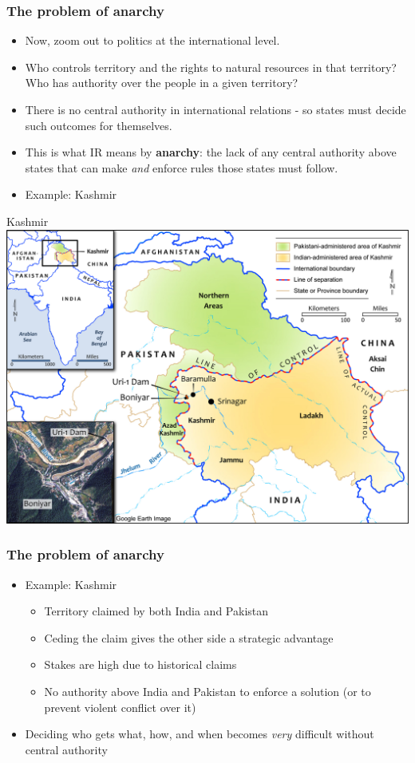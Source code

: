 \documentclass{beamer}
\begin{document}
\begin{frame} 
\frametitle{\LARGE{The problem of anarchy}}
\begin{itemize}
	\item Now, zoom out to politics at the international level. \pause
	\item Who controls territory and the rights to natural resources in that territory? Who has authority over the people in a given territory? \pause
    \item There is no central authority in international relations - so states must decide such outcomes for themselves. \pause
    \item This is what IR means by \textbf{anarchy}: the lack of any central authority above states that can make \textit{and} enforce rules those states must follow. \pause
    \item Example: Kashmir
\end{itemize}
\end{frame}

\begin{frame}{\LARGE Kashmir}
    \centering
\includegraphics[width=\textwidth,height=0.8\textheight,keepaspectratio]{Kashmir.jpg}
\end{frame}

\begin{frame} 
\frametitle{\LARGE{The problem of anarchy}}
\begin{itemize}
    \item Example: Kashmir
    \begin{itemize} 
        \item Territory claimed by both India and Pakistan \pause
        \item Ceding the claim gives the other side a strategic advantage \pause
        \item Stakes are high due to historical claims \pause
        \item No authority above India and Pakistan to enforce a solution (or to prevent violent conflict over it) \pause
    \end{itemize}
    \item Deciding who gets what, how, and when becomes \textit{very} difficult without central authority
\end{itemize}
\end{frame}
\end{document}
